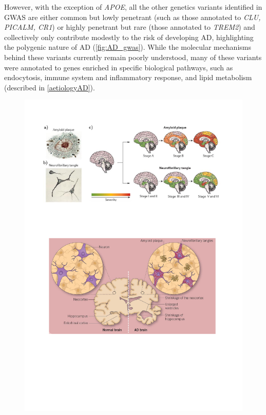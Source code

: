 However, with the exception of \textit{APOE}, all the other genetics variants identified in GWAS are either common but lowly penetrant (such as those annotated to \textit{CLU, PICALM, CR1}) or highly penetrant but rare (those annotated to \textit{TREM2}) and collectively only contribute modestly to the risk of developing AD, highlighting the polygenic nature of AD (\cref{fig:AD_gwas}). While the molecular mechanisms behind these variants currently remain poorly understood, many of these variants were annotated to genes enriched in specific biological pathways, such as endocytosis, immune system and inflammatory response, and lipid metabolism (described in \cref{aetiologyAD}). 


\begin{landscape}
	\begin{figure}[!htp]
		\centering
		\includegraphics[page=11,trim={0 17cm 0cm 1cm},clip, scale = 1.2]{Figures/Introduction_Figures.pdf}

\end{figure}
\end{landscape}
